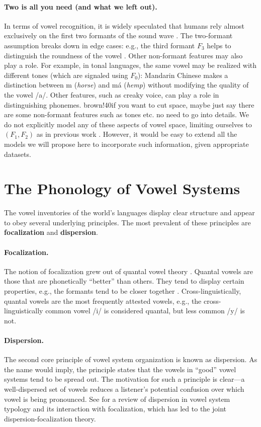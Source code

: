 \documentclass[11pt,a4paper]{article}
\newcommand{\cc}[2][]{{brown!40}{#2}}
\begin{document}
\paragraph{Two is all you need (and what we left out).}
In terms of vowel recognition, it is widely speculated that humans
rely almost exclusively on the first two formants of the sound wave
\cite[Chapter 5]{ladefoged2012vowels}. The two-formant assumption breaks down in edge cases: e.g., the
third formant $F_3$ helps to distinguish the roundness of the vowel
\cite[Chapter 5]{ladefoged2012vowels}.  Other non-formant
features may also play a role. For example, in tonal languages, the same
vowel may be realized with different tones (which are signaled using $F_0$):
Mandarin Chinese makes a distinction between m ({\em horse}) and m{\'a} ({\em hemp}) without
modifying the quality of the vowel /a/. Other features, such as creaky
voice, can play a role in distinguishing phonemes. \cc{if you want to cut space, maybe just say there are some non-formant features such as tones etc. no need to go into details.} We do not
explicitly model any of these aspects of vowel space, limiting ourselves to $(F_1, F_2)$
as in previous work \cite{liljencrants1972numerical}. However, it would be easy to extend
all the models we will propose here to incorporate such information, given
appropriate datasets.

\section{The Phonology of Vowel
Systems}\label{sec:phonology}
The vowel inventories
of the world's languages display clear structure
and appear to obey several underlying principles. The most prevalent
of these principles are \textbf{focalization} and \textbf{dispersion}.
\paragraph{Focalization.}
The notion of focalization grew out of quantal vowel theory
\cite{stevens1989quanta}.  Quantal vowels are those that are phonetically
``better'' than others.  They tend to display certain properties,
e.g., the formants tend to be closer together
\cite{stevens1987relational}. Cross-linguistically, quantal vowels are the most
frequently attested vowels, e.g., the cross-linguistically common
vowel /i/ is considered quantal, but
less common /y/ is not.

\paragraph{Dispersion.}
The second core principle of vowel system organization is known as
dispersion. As the name would imply, the principle states that
the vowels in ``good'' vowel systems tend to be spread out. The motivation
for such a principle is clear---a well-dispersed set of vowels
reduces a listener's potential confusion over which vowel is being
pronounced. See 
for a review of dispersion in vowel system typology and its interaction
with focalization, which has led to the joint dispersion-focalization theory.
\end{document}
